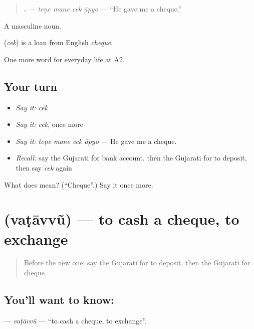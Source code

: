 \begin{quote}
\textbf{   .} — \emph{teṇe mane cek āpyo} — \textquotedblleft{}He gave me a cheque.\textquotedblright{}
\end{quote}

A masculine noun.

\begin{cousinweb}
\textbf{} (\emph{cek}) is a loan from English \emph{cheque}.
\end{cousinweb}

\begin{grammarlens}[title={What you've built}]
One more word for everyday life at A2.
\end{grammarlens}

\subsection*{Your turn}
\begin{itemize}
\raggedright
  \item \emph{Say it:} \emph{cek}
  \item \emph{Say it:} \emph{cek}, once more
  \item \emph{Say it:} \emph{teṇe mane cek āpyo} — He gave me a cheque.
  \item \emph{Recall:} say the Gujarati for bank account, then the Gujarati for to deposit, then say \emph{cek} again
\end{itemize}

\begin{tcolorbox}[breakable,colback=teal!4,colframe=teal!35!black,title={Before you move on}]
What does  mean? (\textquotedblleft{}Cheque\textquotedblright{}.) Say it once more.
\end{tcolorbox}
\section[\texorpdfstring{\gu{વટાવવું} (vaṭāvvũ)}{વટાવવું (vaṭāvvũ)}]{ (vaṭāvvũ) — to cash a cheque, to exchange}

\label{lesson:GU-C190-vatavvu}



\begin{quote}
Before the new one: say the Gujarati for to deposit, then the Gujarati for cheque.
\end{quote}

\subsection*{You'll want to know: }
\textbf{} — \emph{vaṭāvvũ} — \textquotedblleft{}to cash a cheque, to exchange\textquotedblright{}.

